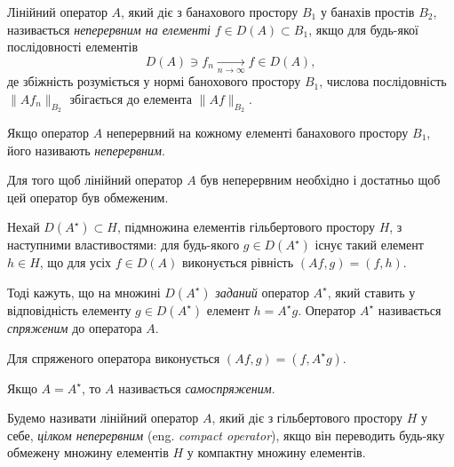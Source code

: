 \begin{definition}
    Лінійний оператор $A$, який діє з банахового простору $B_1$ у банахів простів $B_2$, називається \emph{неперервним на елементі} $f \in D(A) \subset B_1$, якщо для будь-якої послідовності елементів
    \begin{equation*}
        D(A) \ni f_n \xrightarrow[n \to \infty]{} f \in D(A),
    \end{equation*}
    де збіжність розуміється у нормі банохового простору $B_1$, числова послідовність $\|Af_n\|_{B_2}$ збігається до елемента $\|Af\|_{B_2}$.
\end{definition}

\begin{definition}
    Якщо оператор $A$ неперервний на кожному елементі банахового простору $B_1$, його називають \emph{неперервним}.
\end{definition}

\begin{proposition}
    Для того щоб лінійний оператор $A$ був неперервним необхідно і достатньо щоб цей оператор був обмеженим.
\end{proposition}

Нехай $D(A^\star) \subset H$, підмножина елементів гільбертового простору $H$, з наступними властивостями: для будь-якого $g \in D(A^\star)$ існує такий елемент $h \in H$, що для усіх $f \in D(A)$ виконується рівність $(A f, g) = (f, h)$.

\begin{definition}
    Тоді кажуть, що на множині $D(A^\star)$ \emph{заданий} оператор $A^\star$, який ставить у відповідність елементу $g \in D(A^\star)$ елемент $h = A^\star g$. Оператор $A^\star$ називається \emph{спряженим} до оператора $A$.
\end{definition}

\begin{proposition}
    Для  спряженого оператора виконується $(A f, g) = (f, A^\star g)$.
\end{proposition}

\begin{definition}
    Якщо $A = A^\star$, то $A$ називається \emph{самоспряженим}.
\end{definition}

\begin{definition}
    Будемо називати лінійний оператор $A$, який діє з гільбертового простору $H$ у себе, \emph{цілком неперервним} (eng. \emph{compact operator}), якщо він переводить будь-яку обмежену множину елементів $H$ у компактну множину елементів.
\end{definition}

